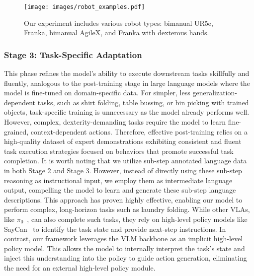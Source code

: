 \begin{figure}[t]
    \centering
    \texttt{[image: images/robot\_examples.pdf]}
    \caption{Our experiment includes various robot types: bimanual UR5e, Franka, bimanual AgileX, and Franka with dexterous hands.}\label{fig:example_robots}
\end{figure}

\subsubsection{Stage 3: Task-Specific Adaptation}
\label{sec:task_specific_adaptation}
This phase refines the model's ability to execute downstream tasks skillfully and fluently, analogous to the post-training stage in large language models where the model is fine-tuned on domain-specific data.  For simpler, less generalization-dependent tasks, such as shirt folding, table bussing, or bin picking with trained objects, task-specific training is unnecessary as the model already performs well.  However, complex, dexterity-demanding tasks require the model to learn fine-grained, context-dependent actions.  Therefore, effective post-training relies on a high-quality dataset of expert demonstrations exhibiting consistent and fluent task execution strategies focused on behaviors that promote successful task completion.
It is worth noting that we utilize sub-step annotated language data in both Stage 2 and Stage 3. However, instead of directly using these sub-step reasoning as instructional input, we employ them as intermediate language output, compelling the model to learn and generate these sub-step language descriptions. This approach has proven highly effective, enabling our model to perform complex, long-horizon tasks such as laundry folding. While other VLAs, like $\pi_0$~\cite{[pi0}, can also complete such tasks, they rely on high-level policy models like SayCan~\cite{ahn2022can} to identify the task state and provide next-step instructions. In contrast, our framework leverages the VLM backbone as an implicit high-level policy model. This allows the model to internally interpret the task's state and inject this understanding into the policy to guide action generation, eliminating the need for an external high-level policy module.



